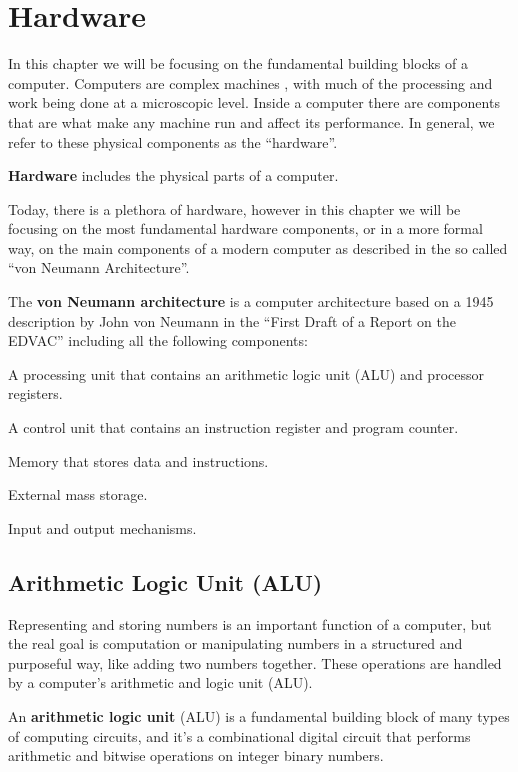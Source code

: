 
\section{Hardware}

In this chapter we will be focusing on the fundamental building blocks of a computer. Computers are complex machines
, with much of the processing and work being done at a microscopic level. Inside a computer there are components that
are what make any machine run and affect its performance. In general, we refer to these physical components as the
``hardware''.

\bd[Hardware]
\textbf{Hardware} includes the physical parts of a computer.
\ed

Today, there is a plethora of hardware, however in this chapter we will be focusing on the most fundamental hardware
components, or in a more formal way, on the main components of a modern computer as described in the so called ``von
Neumann Architecture''.

The \textbf{von Neumann architecture} is a computer architecture based on a 1945 description by John von Neumann in
the ``First Draft of a Report on the EDVAC'' including all the following components:
\bit
\item A processing unit that contains an arithmetic logic unit (ALU) and processor registers.
\item A control unit that contains an instruction register and program counter.
\item Memory that stores data and instructions.
\item External mass storage.
\item Input and output mechanisms.
\eit
\ed

\subsection{Arithmetic Logic Unit (ALU)}

Representing and storing numbers is an important function of a computer, but the real goal is computation or
manipulating numbers in a structured and purposeful way, like adding two numbers together. These operations are
handled by a computer's arithmetic and logic unit (ALU).

An \textbf{arithmetic logic unit} (ALU) is a fundamental building block of many types of computing circuits, and
it's a combinational digital circuit that performs arithmetic and bitwise operations on integer binary numbers.
\ed

